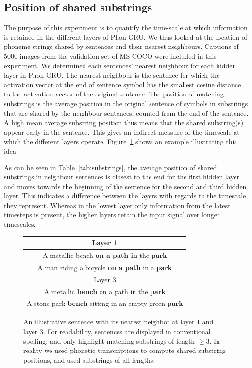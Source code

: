 \subsection{Position of shared substrings}
The purpose of this experiment is to quantify the time-scale at which information is retained in the different layers of {\sc Phon GRU}. We thus looked at the location of phoneme strings shared by sentences and their nearest neighbours. Captions of 5000 images from the validation set of MS COCO were included in this experiment. We determined each sentences' nearest neighbour for each hidden layer in {\sc Phon GRU}. The nearest neighbour is the sentence for which the activation vector at the end of sentence symbol has the smallest cosine distance to the activation vector of the original sentence. The position of matching substrings is the average position in the original sentence of symbols in substrings that are shared by the neighbour sentences, counted from the end of the sentence. A high mean average substring position thus means that the shared substring(s) appear early in the sentence. This gives an indirect measure of the timescale at which the different layers operate. Figure~\ref{fig:example-shared} shows an example illustrating this idea. 

As can be seen in Table~\ref{tab:substrings}, the average position of shared substrings in neighbour sentences is closest to the end for the first hidden layer and moves towards the beginning of the sentence for the second and third hidden layer. This indicates a difference between the layers with regards to the timescale they represent. Whereas in the lowest layer only information from the latest timesteps is present, the higher layers retain the input  signal over longer timescales.


\begin{figure}[h]
  \begin{tabular}{c}
    Layer 1 \\\hline
    A metallic bench {\bf on a path in} the {\bf park} \\
    A man riding a bicycle {\bf on a path} in a {\bf park} \\\hline
    Layer 3 \\\hline
    A metallic {\bf bench} on a path in the {\bf park} \\
    A stone park {\bf bench} sitting in an empty green {\bf park}\\ \hline
  \end{tabular}
  \caption{An illustrative sentence with its nearest neighbor at layer 1 and layer 3. For readability, sentences are displayed in conventional spelling, and only highlight matching substrings of length $\geq3$. In reality we used phonetic transcriptions to compute shared substring positions, and used substrings of all lengths. }
\label{fig:example-shared}
\end{figure}


